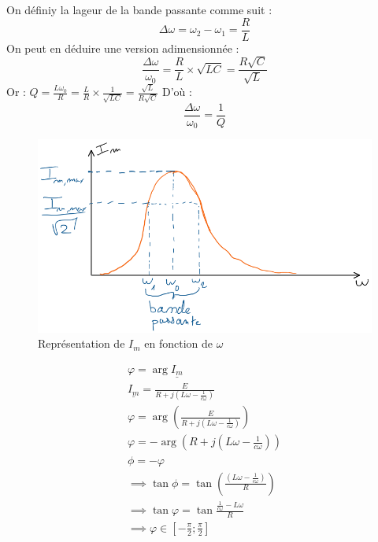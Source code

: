 \begin{definition} On définiy la lageur de la bande passante comme suit : 
    \[
        \Delta \omega = \omega_{2} - \omega _{1} = \frac{R}{L}
    \]
    On peut en déduire une version adimensionnée : 
    \[
        \frac{\Delta \omega }{\omega_{0}} = \frac{R}{L} \times \sqrt{LC} = \frac{R\sqrt{C}}{\sqrt{L}}
    \]
    Or : \(Q = \frac{L \omega _{0}}{R} = \frac{L}{R} \times \frac{1}{\sqrt{LC}} = \frac{\sqrt{L}}{R\sqrt{C}}\) 
    D'où : 
    \[
        \frac{\Delta \omega }{\omega _{0}} = \frac{1}{Q}
    \]
\end{definition}

\begin{figure}[!htb]
    \centering
    \includegraphics[width=1\textwidth]{SCHEMA12.png}
    \caption{Représentation de \(I_{m}\) en fonction de \(\omega\)}
    \label{fig:SCHEMA12}
\end{figure}

\begin{eqnarray*}
    \varphi = \arg \underline{I_{m}} \\
    \underline{I_{m}} = \frac{E}{R + j(L \omega -\frac{1}{c \omega })} \\
    \varphi = \arg (\frac{E}{R + j(L \omega -\frac{1}{c \omega })}) \\
    \varphi  = -\arg (R+j(L \omega -\frac{1}{c \omega })) \\
    \phi = - \varphi \\
    \implies \tan \phi  = \tan (\frac{(L \omega - \frac{1}{c \omega })}{R}) \\
    \implies \tan \varphi  = \tan \frac{\frac{1}{c \omega }- L \omega }{R} \\
    \implies \varphi \in [- \frac{\pi }{2} ; \frac{\pi }{2}]
\end{eqnarray*}

